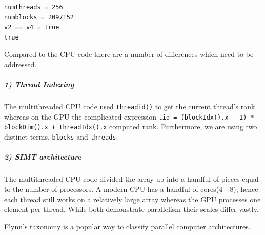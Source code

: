 \documentclass[12pt,a4paper]{article}
\begin{document}
\begin{lstlisting}
numthreads = 256
numblocks = 2097152
v2 == v4 = true
true
\end{lstlisting}


Compared to the CPU code there are a number of differences which need to be addressed.

\subparagraph{1) Thread Indexing}
The multithreaded CPU code used \texttt{threadid()} to get the current thread's rank whereas on the GPU the complicated expression \texttt{tid = (blockIdx().x - 1) * blockDim().x + threadIdx().x} computed rank. Furthermore, we are using two distinct terms, \texttt{blocks} and \texttt{threads}.

\subparagraph{2) SIMT architecture}
The multithreaded CPU code divided the array up into a handful of pieces equal to the number of processors. A modern CPU has a handful of cores(4 - 8), hence each thread still works on a relatively large array whereas the GPU processes one element per thread. While both demonstrate parallelism their scales differ vastly.

Flynn's taxonomy is a popular way to classify parallel computer architectures.
\end{document}
